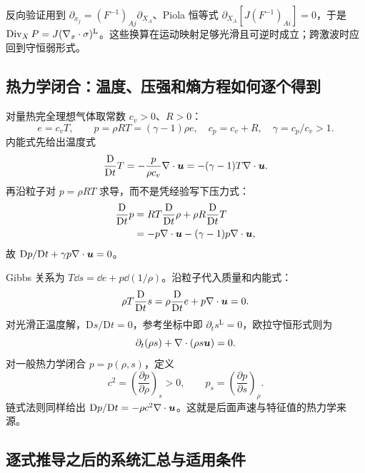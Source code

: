 反向验证用到 $\partial_{x_j}=(F^{-1})_{Aj}\partial_{X_A}$、Piola 恒等式 $\partial_{X_A}[J(F^{-1})_{Ai}]=0$，于是 $\operatorname{Div}_XP=J(\nabla_x\cdot\sigma)^{\mathrm L}$。这些换算在运动映射足够光滑且可逆时成立；跨激波时应回到守恒弱形式。

\subsection{热力学闭合：温度、压强和熵方程如何逐个得到}

对量热完全理想气体取常数 $c_v>0$、$R>0$：
\begin{equation}
 e=c_vT,\qquad p=\rho RT=(\gamma-1)\rho e,
 \quad c_p=c_v+R,\quad\gamma=c_p/c_v>1.
\end{equation}
内能式先给出温度式
\begin{equation}
 \frac{\mathrm D}{\mathrm Dt} T=-\frac p{\rho c_v}\nabla\cdot\bm{u}
 =-(\gamma-1)T\nabla\cdot\bm{u}.
\end{equation}
再沿粒子对 $p=\rho RT$ 求导，而不是凭经验写下压力式：
\begin{align}
 \frac{\mathrm D}{\mathrm Dt} p&=RT\frac{\mathrm D}{\mathrm Dt}\rho+\rho R\frac{\mathrm D}{\mathrm Dt} T\\
 &=-p\nabla\cdot\bm{u}-(\gamma-1)p\nabla\cdot\bm{u},
\end{align}
故 $\mathrm Dp/\mathrm Dt+\gamma p\nabla\cdot\bm{u}=0$。

Gibbs 关系为 $T\dd s=\dd e+p\dd(1/\rho)$。沿粒子代入质量和内能式：
\begin{equation}
 \rho T\frac{\mathrm D}{\mathrm Dt} s=\rho\frac{\mathrm D}{\mathrm Dt} e+p\nabla\cdot\bm{u}=0.
\end{equation}
对光滑正温度解，$\mathrm Ds/\mathrm Dt=0$，参考坐标中即 $\partial_ts^{\mathrm L}=0$，欧拉守恒形式则为
\begin{equation}
 \partial_t(\rho s)+\nabla\cdot(\rho s\bm{u})=0.
\end{equation}
对一般热力学闭合 $p=p(\rho,s)$，定义
\begin{equation}
 c^2=\left(\frac{\partial p}{\partial\rho}\right)_s>0,
 \qquad p_s=\left(\frac{\partial p}{\partial s}\right)_\rho.
\end{equation}
链式法则同样给出 $\mathrm Dp/\mathrm Dt=-\rho c^2\nabla\cdot\bm{u}$。这就是后面声速与特征值的热力学来源。

\subsection{逐式推导之后的系统汇总与适用条件}

